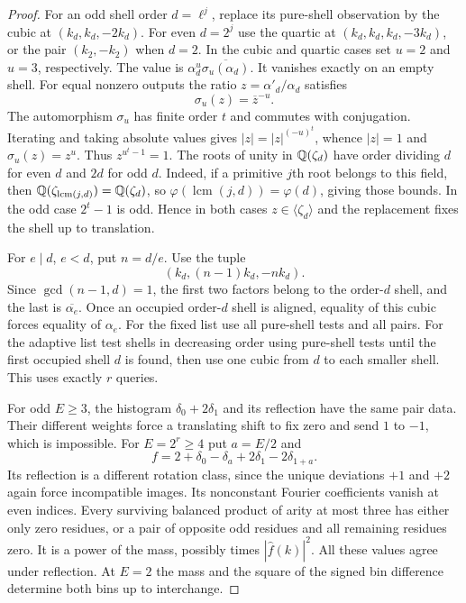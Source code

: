 \documentclass[11pt]{article}
\newcommand{\lcm}{\operatorname{lcm}}\newcommand{\Fh}{\widehat f}
\begin{document}
\begin{proof}
For an odd shell order $d=\ell^j$, replace its pure-shell observation by the cubic at $(k_d,k_d,-2k_d)$. For even $d=2^j$ use the quartic at $(k_d,k_d,k_d,-3k_d)$, or the pair $(k_2,-k_2)$ when $d=2$. In the cubic and quartic cases set $u=2$ and $u=3$, respectively. The value is $\alpha_d^u\overline{\sigma_u(\alpha_d)}$. It vanishes exactly on an empty shell. For equal nonzero outputs the ratio $z=\alpha'_d/\alpha_d$ satisfies
\[
 \sigma_u(z)=\overline z^{-u}.
\]
The automorphism $\sigma_u$ has finite order $t$ and commutes with conjugation. Iterating and taking absolute values gives $|z|=|z|^{(-u)^t}$, whence $|z|=1$ and $\sigma_u(z)=z^u$. Thus $z^{u^t-1}=1$. The roots of unity in $\mathbb Q(\zeta_d)$ have order dividing $d$ for even $d$ and $2d$ for odd $d$. Indeed, if a primitive $j$th root belongs to this field, then $\Q(\zeta_{\lcm(j,d)})=\Q(\zeta_d)$, so $\varphi(\lcm(j,d))=\varphi(d)$, giving those bounds. In the odd case $2^t-1$ is odd. Hence in both cases $z\in\langle\zeta_d\rangle$ and the replacement fixes the shell up to translation.

For $e\mid d$, $e<d$, put $n=d/e$. Use the tuple
\[
 (k_d,(n-1)k_d,-n k_d).
\]
Since $\gcd(n-1,d)=1$, the first two factors belong to the order-$d$ shell, and the last is $\overline{\alpha_e}$. Once an occupied order-$d$ shell is aligned, equality of this cubic forces equality of $\alpha_e$. For the fixed list use all pure-shell tests and all pairs. For the adaptive list test shells in decreasing order using pure-shell tests until the first occupied shell $d$ is found, then use one cubic from $d$ to each smaller shell. This uses exactly $r$ queries.

For odd $E\ge3$, the histogram $\delta_0+2\delta_1$ and its reflection have the same pair data. Their different weights force a translating shift to fix zero and send $1$ to $-1$, which is impossible. For $E=2^r\ge4$ put $a=E/2$ and
\[
 f=2+\delta_0-\delta_a+2\delta_1-2\delta_{1+a}.
\]
Its reflection is a different rotation class, since the unique deviations $+1$ and $+2$ again force incompatible images. Its nonconstant Fourier coefficients vanish at even indices. Every surviving balanced product of arity at most three has either only zero residues, or a pair of opposite odd residues and all remaining residues zero. It is a power of the mass, possibly times $|\Fh(k)|^2$. All these values agree under reflection. At $E=2$ the mass and the square of the signed bin difference determine both bins up to interchange.
\end{proof}
\end{document}
